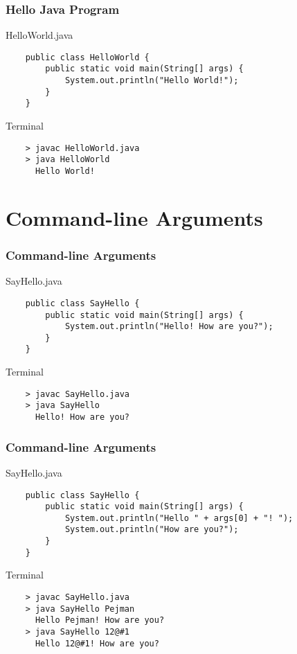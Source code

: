 \documentclass[10pt, compress]{beamer}
\begin{document}
\begin{frame}[fragile]
  \frametitle{Hello Java Program}
  \begin{block}{HelloWorld.java}
    \begin{verbatim}
    public class HelloWorld {
        public static void main(String[] args) {
            System.out.println("Hello World!");
        }
    }
    \end{verbatim}
  \end{block}
  \begin{block}{Terminal}
    \begin{verbatim}
    > javac HelloWorld.java
    > java HelloWorld
      Hello World!
    \end{verbatim}
  \end{block}
\end{frame}

\section{Command-line Arguments}

\begin{frame}[fragile]
  \frametitle{Command-line Arguments}
  \begin{block}{SayHello.java}
    \begin{verbatim}
    public class SayHello {
        public static void main(String[] args) {
            System.out.println("Hello! How are you?");
        }
    }
    \end{verbatim}
  \end{block}
  \begin{block}{Terminal}
    \begin{verbatim}
    > javac SayHello.java
    > java SayHello
      Hello! How are you?
    \end{verbatim}
  \end{block}
\end{frame}

\begin{frame}[fragile]
  \frametitle{Command-line Arguments}
  \begin{block}{SayHello.java}
    \begin{verbatim}
    public class SayHello {
        public static void main(String[] args) {
            System.out.println("Hello " + args[0] + "! ");
            System.out.println("How are you?");
        }
    }
    \end{verbatim}
  \end{block}
  \begin{block}{Terminal}
    \begin{verbatim}
    > javac SayHello.java
    > java SayHello Pejman
      Hello Pejman! How are you?
    > java SayHello 12@#1
      Hello 12@#1! How are you?
    \end{verbatim}
  \end{block}
\end{frame}
\end{document}
